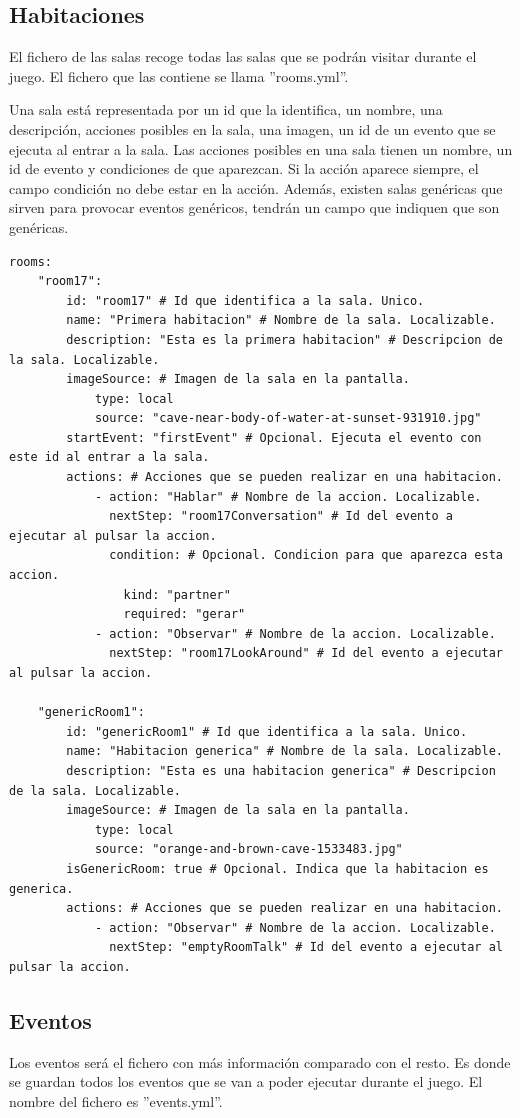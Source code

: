 \subsection{Habitaciones}
El fichero de las salas recoge todas las salas que se podrán visitar durante el juego. El fichero que las contiene se llama ''rooms.yml''.

Una sala está representada por un id que la identifica, un nombre, una descripción, acciones posibles en la sala, una imagen, un id de un evento que se ejecuta al entrar a la sala.
Las acciones posibles en una sala tienen un nombre, un id de evento y condiciones de que aparezcan. Si la acción aparece siempre, el campo condición no debe estar en la acción.
Además, existen salas genéricas que sirven para provocar eventos genéricos, tendrán un campo que indiquen que son genéricas.

\begin{lstlisting}
rooms:
	"room17":
		id: "room17" # Id que identifica a la sala. Unico.
		name: "Primera habitacion" # Nombre de la sala. Localizable.
		description: "Esta es la primera habitacion" # Descripcion de la sala. Localizable.
		imageSource: # Imagen de la sala en la pantalla.
			type: local
			source: "cave-near-body-of-water-at-sunset-931910.jpg"
		startEvent: "firstEvent" # Opcional. Ejecuta el evento con este id al entrar a la sala.
		actions: # Acciones que se pueden realizar en una habitacion.
			- action: "Hablar" # Nombre de la accion. Localizable.
			  nextStep: "room17Conversation" # Id del evento a ejecutar al pulsar la accion.
			  condition: # Opcional. Condicion para que aparezca esta accion.
				kind: "partner"
				required: "gerar"
			- action: "Observar" # Nombre de la accion. Localizable.
			  nextStep: "room17LookAround" # Id del evento a ejecutar al pulsar la accion.

	"genericRoom1":
		id: "genericRoom1" # Id que identifica a la sala. Unico.
		name: "Habitacion generica" # Nombre de la sala. Localizable.
		description: "Esta es una habitacion generica" # Descripcion de la sala. Localizable.
		imageSource: # Imagen de la sala en la pantalla.
			type: local
			source: "orange-and-brown-cave-1533483.jpg"
		isGenericRoom: true # Opcional. Indica que la habitacion es generica.
		actions: # Acciones que se pueden realizar en una habitacion.
			- action: "Observar" # Nombre de la accion. Localizable.
		 	  nextStep: "emptyRoomTalk" # Id del evento a ejecutar al pulsar la accion.
\end{lstlisting}

\subsection{Eventos}
Los eventos será el fichero con más información comparado con el resto. Es donde se guardan todos los eventos que se van a poder ejecutar durante el juego. El nombre del fichero es ''events.yml''.


